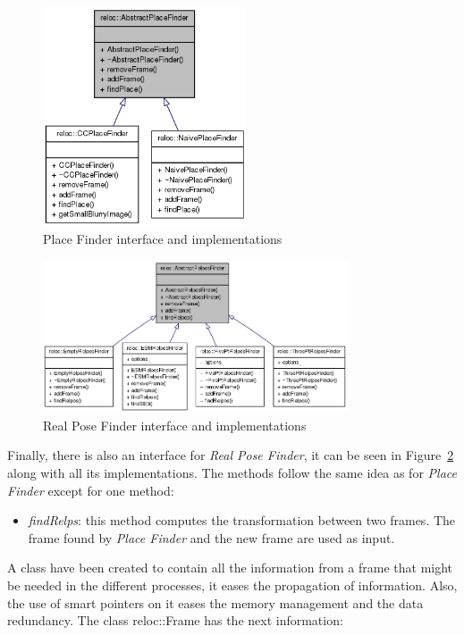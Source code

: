 \begin{figure}[htpb]
  \centering
  \includegraphics[width=6cm]{img/class_abstract_placerecognition.png}
  \caption{Place Finder interface and implementations}
  \label{fig:class_abstract_placerecognition}
\end{figure}

\begin{figure}[htpb]
  \centering
  \includegraphics[width=9cm]{img/class_abstract_relposfinder.png}
  \caption{Real Pose Finder interface and implementations}
  \label{fig:class_abstract_relposfinder}
\end{figure}

Finally, there is also an interface for \textit{Real Pose Finder}, it can be seen in Figure~\ref{fig:class_abstract_relposfinder} along with all its implementations. The methods follow the same idea as for \textit{Place Finder} except for one method:

\begin{itemize}
  \item \textit{findRelps}: this method computes the transformation between two frames. The frame found by \textit{Place Finder} and the new frame are used as input.
\end{itemize}


A class have been created to contain all the information from a frame that might be needed in the different processes, it eases the propagation of information. Also, the use of smart pointers on it eases the memory management and the data redundancy. The class reloc::Frame has the next information:

